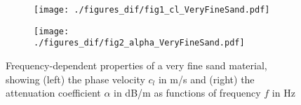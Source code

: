 \documentclass{article}[a4paper, 12pt]
\begin{document}
\begin{figure}[h!]
    \centering
    \begin{subfigure}[b]{0.45\textwidth}  %
        \texttt{[image: ./figures\_dif/fig1\_cl\_VeryFineSand.pdf]}
    \end{subfigure}
    \hspace{0.15cm} 
    \begin{subfigure}[b]{0.45\textwidth}
        \texttt{[image: ./figures\_dif/fig2\_alpha\_VeryFineSand.pdf]}
    \end{subfigure}
    
    \caption{ Frequency-dependent properties of a very fine sand material, showing (left) the phase velocity $c_l$ in m/s and (right) the attenuation coefficient 
    $\alpha$ in dB/m as functions of frequency $f$ in Hz}
\end{figure}





\clearpage
\printbibliography
\end{document}
